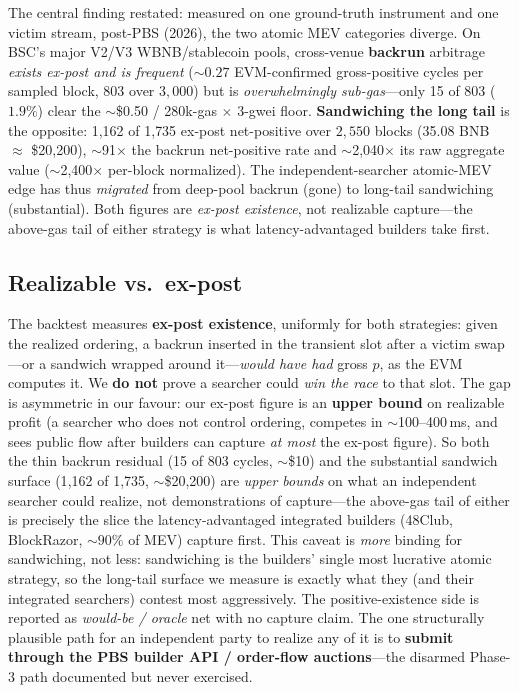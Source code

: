\documentclass[11pt]{article}
\begin{document}
The central finding restated: measured on one ground-truth instrument and one victim
stream, post-PBS (2026), the two atomic MEV categories diverge. On BSC's major V2/V3
WBNB/stablecoin pools, cross-venue \textbf{backrun} arbitrage \emph{exists ex-post and
is frequent} ($\sim$$0.27$ EVM-confirmed gross-positive cycles per sampled block,
$803$ over $3{,}000$) but is \emph{overwhelmingly sub-gas}---only 15 of 803 ($1.9\%$)
clear the $\sim$\$0.50 / 280k-gas $\times$ 3-gwei floor. \textbf{Sandwiching the long
tail} is the opposite: 1{,}162 of 1{,}735 ex-post net-positive over $2{,}550$ blocks
(35.08 BNB $\approx$ \$20{,}200), $\sim$91$\times$ the backrun net-positive rate and
$\sim$2{,}040$\times$ its raw aggregate value ($\sim$2{,}400$\times$ per-block normalized). The independent-searcher atomic-MEV edge has thus
\emph{migrated} from deep-pool backrun (gone) to long-tail sandwiching (substantial).
Both figures are \emph{ex-post existence}, not realizable capture---the above-gas tail
of either strategy is what latency-advantaged builders take first.

\subsection{Realizable vs.\ ex-post}
\label{sec:realizable}
The backtest measures \textbf{ex-post existence}, uniformly for both strategies:
given the realized ordering, a backrun inserted in the transient slot after a victim
swap---or a sandwich wrapped around it---\emph{would have had} gross $p$, as the EVM
computes it. We \textbf{do not} prove a searcher could \emph{win the race} to that
slot. The gap is asymmetric in our favour: our ex-post figure is an \textbf{upper
bound} on realizable profit (a searcher who does not control ordering, competes in
$\sim$100--400\,ms, and sees public flow after builders
\cite{wang2025binance,bep322} can capture \emph{at most} the ex-post figure). So both
the thin backrun residual (15 of 803 cycles, $\sim$\$10) and the substantial sandwich
surface (1{,}162 of 1{,}735, $\sim$\$20{,}200) are \emph{upper bounds} on what an
independent searcher could realize, not demonstrations of capture---the above-gas tail
of either is precisely the slice the latency-advantaged integrated builders (48Club,
BlockRazor, $\sim$$90\%$ of MEV) capture first. This caveat is \emph{more} binding for
sandwiching, not less: sandwiching is the builders' single most lucrative atomic
strategy, so the long-tail surface we measure is exactly what they (and their
integrated searchers) contest most aggressively. The positive-existence side is
reported as \emph{would-be / oracle} net with no capture claim. The one structurally
plausible path for an independent party to realize any of it is to \textbf{submit
through the PBS builder API / order-flow auctions}---the disarmed Phase-3 path
documented but never exercised.
\end{document}
